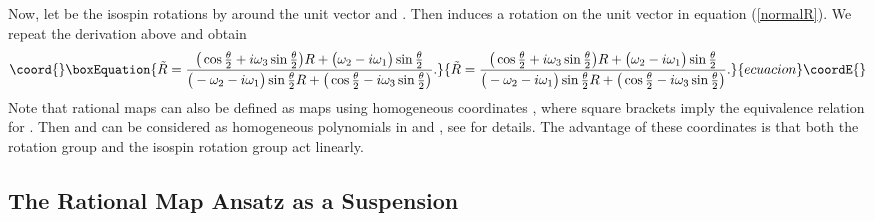 \documentclass[a4paper,12pt]{article}
\begin{document}
Now, let \coordHE{} be the isospin rotations by 
\myHighlight{$\theta$}\coordHE{} around  the unit vector \coordHE{} and \coordHE{}. Then \coordHE{} induces a rotation \coordHE{} on the unit vector \coordHE{} in equation (\ref{normalR}). We repeat the derivation 
above and obtain
%
\begin{equation}\coord{}\boxEquation{
{\tilde R} = \frac{\big( \cos \frac{\theta}{2} + i \omega_3 \sin
\frac{\theta}{2} \big) R   + \big(\omega_2 - i \omega_1 \big) \sin
\frac{\theta}{2}} 
{\big(- \omega_2 - i \omega_1 \big) \sin
\frac{\theta}{2} R +\big( \cos \frac{\theta}{2} - i \omega_3 \sin
\frac{\theta}{2} \big)}.
}{
{\tilde R} = \frac{\big( \cos \frac{\theta}{2} + i \omega_3 \sin
\frac{\theta}{2} \big) R   + \big(\omega_2 - i \omega_1 \big) \sin
\frac{\theta}{2}} 
{\big(- \omega_2 - i \omega_1 \big) \sin
\frac{\theta}{2} R +\big( \cos \frac{\theta}{2} - i \omega_3 \sin
\frac{\theta}{2} \big)}.
}{ecuacion}\coordE{}\end{equation}
%
Note that rational maps can also be defined as maps \coordHE{} using homogeneous coordinates \myHighlight{$[v_1,v_2] \to [p,q]$}\coordHE{}, 
where square 
brackets imply the equivalence relation \coordHE{} 
for \coordHE{}. Then \coordHE{} and \coordHE{} can be considered as 
homogeneous polynomials in \coordHE{} and \coordHE{}, see \cite{Houghton:1998kg, 
Houghton:2001fe} for details.
The advantage of these coordinates is that both the 
rotation group and the isospin rotation group act linearly.


\subsection{The Rational Map Ansatz as a Suspension}
\label{Suspension}
\end{document}
